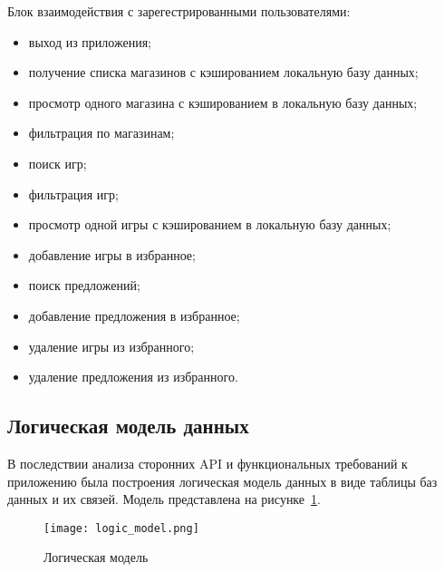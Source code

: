 Блок взаимодействия с зарегестрированными пользователями:

\begin{itemize}
    \item выход из приложения;
    \item получение списка магазинов с кэшированием локальную базу данных;
    \item просмотр одного магазина с кэшированием в локальную базу данных;
    \item фильтрация по магазинам;
    \item поиск игр;
    \item фильтрация игр;
    \item просмотр одной игры с кэшированием в локальную базу данных;
    \item добавление игры в избранное;
    \item поиск предложений;
    \item добавление предложения в избранное;
    \item удаление игры из избранного;
    \item удаление предложения из избранного.
\end{itemize}


\subsection{Логическая модель данных}

В последствии анализа сторонних API и функциональных требований к приложению была построения логическая модель данных в виде таблицы баз данных и их связей. Модель представлена на рисунке~\ref{fig:domain:logic_model}.

\begin{figure}[H]
 \centering
   \texttt{[image: logic\_model.png]} 
   \caption{Логическая модель}
   \label{fig:domain:logic_model}
\end{figure}

